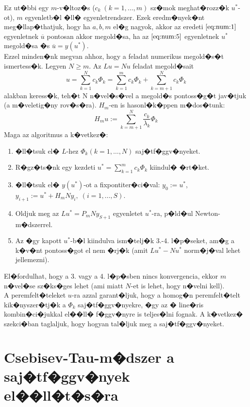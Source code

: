 Ez ut�bbi egy $m$-v�ltoz�s ($c_k \; (k = 1, \dots, m)$ sz�mok meghat�rozz�k $u^*$-ot), $m$ egyenletb�l �ll� egyenletrendszer. Ezek eredm�nyek�nt meg�llap�thatjuk, hogy ha $a, b, m$ el�g nagyok, akkor az eredeti $\eqref{eq:num:1}$ egyenletnek $\overline{u}$ pontosan akkor megold�sa, ha az $\eqref{eq:num:5}$ egyenletnek $u^*$ megold�sa �s $\overline{u} = y(u^*)$. \\
Ezzel minden�nk megvan ahhoz, hogy a feladat numerikus megold�s�t ismertess�k. Legyen $N \geq m$. Az $Lu = Nu$ feladat megold�sait
\begin{equation*}
u = \sum_{k = 1}^N c_k \Phi_k = \sum_{k = 1}^m c_k \Phi_k + \sum_{k = m+1}^N c_k \Phi_k
\end{equation*}
alakban keress�k, teh�t N n�vel�s�vel a megold�s pontoss�g�t jav�tjuk (a m�veletig�ny rov�s�ra). $H_m$-en is hasonl�k�ppen m�dos�tunk:
\begin{equation*}
H_m u := \sum_{k = m+1}^N \frac{c_k}{\lambda_k} \Phi_k
\end{equation*}
Maga az algoritmus a k�vetkez�:
\begin{enumerate}
\item �ll�tsuk el� $L$-hez $\Phi_k (k = 1, \dots, N)$ saj�tf�ggv�nyeket.
\item R�gz�ts�nk egy kezdeti $u^* = \sum_{k = 1}^m c_k \Phi_k$ kiindul� �rt�ket.
\item �ll�tsuk el� $y(u^*)$-ot a fixpontiter�ci�val: $y_0 := u^*$, $y_{i+1} := u^* + H_m N y_i, \; (i = 1, \dots, S)$.
\item Oldjuk meg az $Lu^* = P_m N y_{S+1}$ egyenletet $u^*$-ra, p�ld�ul Newton-m�dszerrel.
\item Az �gy kapott $u^*$-b�l kiindulva ism�telj�k 3.-4. l�p�seket, am�g a k�v�nt pontoss�got el nem �rj�k (amit $Lu^* - Nu^*$ norm�j�val lehet jellemezni).
\end{enumerate}
El�fordulhat, hogy a 3. vagy a 4. l�p�sben nincs konvergencia, ekkor $m$ n�vel�se sz�ks�ges lehet (ami miatt $N$-et is lehet, hogy n�velni kell). \\
A peremfelt�teleket $u$-ra azzal garant�ljuk, hogy a homog�n peremfelt�telt kik�nyszer�tj�k a $\Phi_k$ saj�tf�ggv�nyekre, �gy az � line�ris kombin�ci�jukkal el��ll� f�ggv�nyre is teljes�lni fognak. A k�vetkez� szekci�ban taglaljuk, hogy hogyan tal�ljuk meg a saj�tf�ggv�nyeket.

\section{Csebisev-Tau-m�dszer a saj�tf�ggv�nyek el��ll�t�s�ra}
\label{sec:ChebTau}

